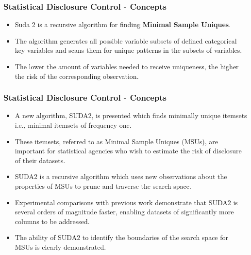 \documentclass[SDCmaster.tex]{subfiles}
\begin{document}
	
	\begin{frame}
		\frametitle{Statistical Disclosure Control - Concepts}
		\Large
		\begin{itemize}
\item Suda 2 is a recursive algorithm for finding \textbf{Minimal Sample Uniques}.
\item The algorithm generates all
possible variable subsets of defined categorical key variables and scans them for unique patterns in
the subsets of variables.
\item The lower the amount of variables needed to receive uniqueness, the higher
the risk of the corresponding observation.
\end{itemize}
\end{frame}
\begin{frame}
	\frametitle{Statistical Disclosure Control - Concepts}
	\Large
	\begin{itemize}
\item A new algorithm, SUDA2, is presented which finds minimally unique itemsets i.e., minimal itemsets of frequency one. 
\item These itemsets, referred to as Minimal Sample Uniques (MSUs), are important for statistical agencies who wish to estimate the risk of disclosure of their datasets. 
\item SUDA2 is a recursive algorithm which uses new observations about the properties of MSUs to prune and traverse the search space.
\item Experimental comparisons with previous work demonstrate that SUDA2 is several orders of magnitude faster, enabling datasets of significantly more columns to be addressed. 
\item The ability of SUDA2 to identify the boundaries of the search space for MSUs is clearly demonstrated.
\end{itemize}
\end{frame}
\end{document}
